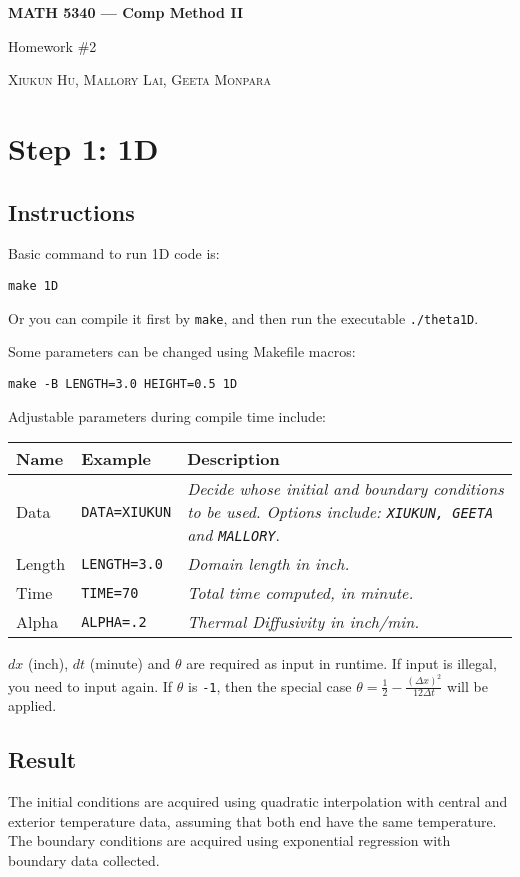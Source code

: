 \documentclass[letterpaper,12pt,fleqn]{article}
\newcommand{\mybox}[1]{\par\noindent\colorbox{shadecolor}
{\parbox{\dimexpr\textwidth-2\fboxsep\relax}{\tt #1}}}
\newcommand{\code}[1]{\colorbox{shadecolor}{\tt #1}}
\newcommand\f{\frac}
\begin{document}
\centerline{\bf \huge MATH 5340 --- Comp Method II}		%
\bigskip							%
\centerline{\Large Homework \#2} 				%
\medskip							%
\centerline{\textsc{Xiukun Hu, Mallory Lai, Geeta Monpara}}	%
\bigskip							%

\section{Step 1: 1D}
\subsection{Instructions}
Basic command to run 1D code is:
\mybox{make 1D}

Or you can compile it first by \code{make}, and then run the executable \code{./theta1D}\;.

Some parameters can be changed using Makefile macros:
\mybox{make -B LENGTH=3.0 HEIGHT=0.5 1D}

Adjustable parameters during compile time include:
\begin{table}[h]
  \begin{tabular}{p{2cm} p{3.3cm} p{7cm}}
    \toprule
    \textbf{Name} & \textbf{Example} & \textbf{Description}\\
    \midrule
    Data    &	\code{DATA=XIUKUN}    &	  \textit{Decide whose initial and boundary conditions to be used.
      Options include:
  \texttt{XIUKUN, GEETA} and \texttt{MALLORY}}.\\
    Length  &	\code{LENGTH=3.0}     &	  \textit{Domain length in inch.}\\
    Time    &	\code{TIME=70}	      &	  \textit{Total time computed, in minute.}\\
    Alpha   &	\code{ALPHA=.2}	      &	  \textit{Thermal Diffusivity in inch/min.}\\
    \bottomrule
  \end{tabular}
\end{table}

$dx$ (inch), $dt$ (minute) and $\theta$ are required as input in runtime.
If input is illegal, you need to input again.
If $\theta$ is \code{-1}, then the special case
$\theta=\f12 -\frac{(\Delta x)^2}{12\Delta t}$
will be applied.

\subsection{Result}
The initial conditions are acquired using quadratic interpolation
with central and exterior temperature data,
assuming that both end have the same temperature.
The boundary conditions are acquired using exponential regression with boundary data collected.
\end{document}
